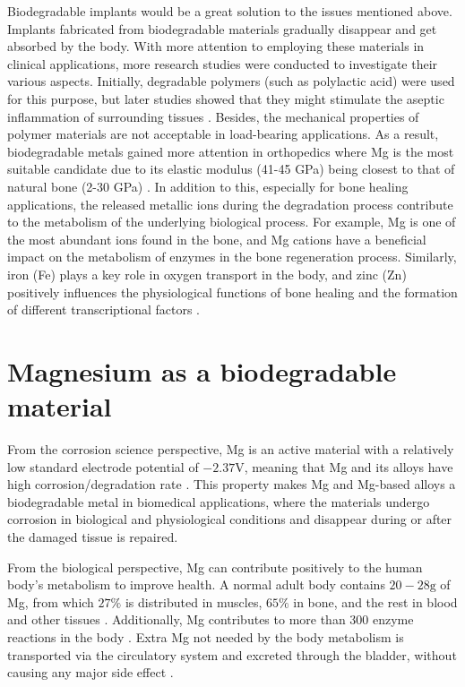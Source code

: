 Biodegradable implants would be a great solution to the issues mentioned above. Implants fabricated from biodegradable materials gradually disappear and get absorbed by the body. With more attention to employing these materials in clinical applications, more research studies were conducted to investigate their various aspects. Initially, degradable polymers (such as polylactic acid) were used for this purpose, but later studies showed that they might stimulate the aseptic inflammation of surrounding tissues \cite{Gao2022}. Besides, the mechanical properties of polymer materials are not acceptable in load-bearing applications. As a result, biodegradable metals gained more attention in orthopedics where Mg is the most suitable candidate due to its elastic modulus (41-45 GPa) being closest to that of natural bone (2-30 GPa) \cite{Wang2020a}. In addition to this, especially for bone healing applications, the released metallic ions during the degradation process contribute to the metabolism of the underlying biological process. For example, Mg is one of the most abundant ions found in the bone, and Mg cations have a beneficial impact on the metabolism of enzymes in the bone regeneration process. Similarly, iron (Fe) plays a key role in oxygen transport in the body, and zinc (Zn) positively influences the physiological functions of bone healing and the formation of different transcriptional factors \cite{Wegener2020,Gasior2021,Han2020,Levy2017,Liu2015}.


\section{Magnesium as a biodegradable material}

From the corrosion science perspective, Mg is an active material with a relatively low standard electrode potential of $-2.37\text{V}$, meaning that Mg and its alloys have high corrosion/degradation rate \cite{Gao2022}. This property makes Mg and Mg-based alloys a biodegradable metal in biomedical applications, where the materials undergo corrosion in biological and physiological conditions and disappear during or after the damaged tissue is repaired. 

From the biological perspective, Mg can contribute positively to the human body's metabolism to improve health. A normal adult body contains $20-28\text{g}$ of Mg, from which $27\%$ is distributed in muscles, $65\%$ in bone, and the rest in blood and other tissues \cite{Vormann2003}. Additionally, Mg contributes to more than 300 enzyme reactions in the body \cite{Elin1988}. Extra Mg not needed by the body metabolism is transported via the circulatory system and excreted through the bladder, without causing any major side effect \cite{Wang2020a}.

